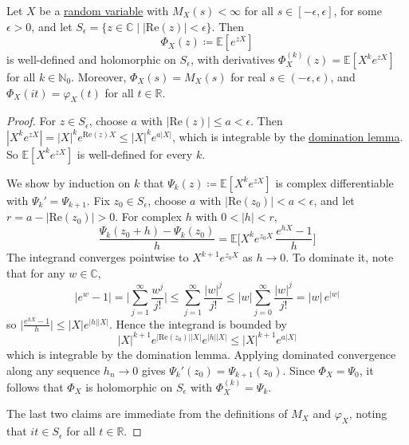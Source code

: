 	\begin{lemma}
	  \label{thm:analytic-extension-of-the-mgf}
		Let $X$ be a \hyperref[def:random-variable]{random variable} with $M_X (s) < \infty$ for all $s \in [-\epsilon, \epsilon]$, for some $\epsilon > 0$, and let $S_\epsilon = \{z \in \mathbb{C} \mid |\mathrm{Re}(z)| < \epsilon\}$. Then 
		\begin{equation}
			\Phi_X (z) \coloneqq \mathbb{E}[e^{z X}]
		\end{equation}
		is well-defined and holomorphic on $S_\epsilon$, with derivatives $\Phi_X^{(k)} (z) = \mathbb{E}[X^k e^{z X}]$ for all $k \in \mathbb{N}_0$. Moreover, $\Phi_X (s) = M_X (s)$ for real $s \in (-\epsilon, \epsilon)$, and $\Phi_X (i t) = \varphi_X (t)$ for all $t \in \mathbb{R}$. 
	\end{lemma}
	\begin{proof}
		For $z \in S_\epsilon$, choose $a$ with $|\mathrm{Re}(z)| \leq a < \epsilon$. Then $|X^k e^{z X}| = |X|^k e^{\mathrm{Re}(z) X} \leq |X|^k e^{a |X|}$, which is integrable by the \hyperref[thm:domination-lemma]{domination lemma}. So $\mathbb{E}[X^k e^{z X}]$ is well-defined for every $k$. 
		
		We show by induction on $k$ that $\Psi_k (z) \coloneqq \mathbb{E}[X^k e^{z X}]$ is complex differentiable with $\Psi_k' = \Psi_{k+1}$. Fix $z_0 \in S_\epsilon$, choose $a$ with $|\mathrm{Re}(z_0)| < a < \epsilon$, and let $r = a - |\mathrm{Re}(z_0)| > 0$. For complex $h$ with $0 < |h| < r$, 
		\begin{equation}
			\frac{\Psi_k (z_0 + h) - \Psi_k (z_0)}{h} = \mathbb{E} \bigg[ X^k e^{z_0 X} \, \frac{e^{h X} - 1}{h} \bigg]
		\end{equation}
		The integrand converges pointwise to $X^{k+1} e^{z_0 X}$ as $h \to 0$. To dominate it, note that for any $w \in \mathbb{C}$, 
		\begin{equation}
			|e^w - 1| = \bigg| \sum_{j=1}^\infty \frac{w^j}{j!} \bigg| \leq \sum_{j=1}^\infty \frac{|w|^j}{j!} \leq |w| \sum_{j=0}^\infty \frac{|w|^j}{j!} = |w| \, e^{|w|}
		\end{equation}
		so $\big| \frac{e^{hX} - 1}{h} \big| \leq |X| e^{|h| |X|}$. Hence the integrand is bounded by 
		\begin{equation}
			|X|^{k+1} e^{|\mathrm{Re}(z_0)| |X|} e^{|h| |X|} \leq |X|^{k+1} e^{a |X|}
		\end{equation}
		which is integrable by the domination lemma. Applying dominated convergence along any sequence $h_n \to 0$ gives $\Psi_k' (z_0) = \Psi_{k+1} (z_0)$. Since $\Phi_X = \Psi_0$, it follows that $\Phi_X$ is holomorphic on $S_\epsilon$ with $\Phi_X^{(k)} = \Psi_k$. 
		
		The last two claims are immediate from the definitions of $M_X$ and $\varphi_X$, noting that $i t \in S_\epsilon$ for all $t \in \mathbb{R}$. 
	\end{proof}

